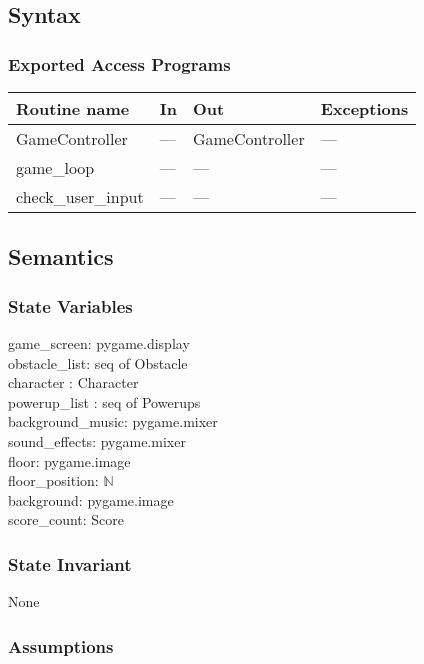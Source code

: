 \documentclass[12pt]{article}
\begin{document}
\subsection* {Syntax}

\subsubsection* {Exported Access Programs}

\begin{tabular}{| l | l | l | l |}
\hline
\textbf{Routine name} & \textbf{In} & \textbf{Out} & \textbf{Exceptions}\\
\hline
    GameController & --- & GameController & ---\\
\hline
    game\_loop & --- & --- & ---\\
\hline
    check\_user\_input & --- & --- & ---\\
\hline
\end{tabular}

\subsection* {Semantics}

\subsubsection* {State Variables}

game\_screen: pygame.display\\
obstacle\_list: seq of Obstacle\\
character : Character \\
powerup\_list : seq of Powerups\\
background\_music: pygame.mixer\\
sound\_effects: pygame.mixer\\
floor: pygame.image\\
floor\_position: $\mathbb{N}$\\
background: pygame.image\\
score\_count: Score


\subsubsection* {State Invariant}

None

\subsubsection* {Assumptions}
\end{document}
